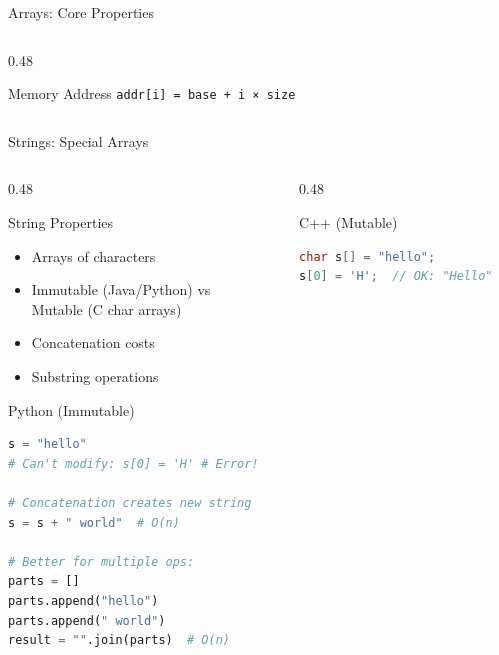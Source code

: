 \documentclass[aspectratio=169,xcolor=dvipsnames]{beamer}
\begin{document}
\begin{frame}{Arrays: Core Properties}
\begin{columns}
\begin{column}{0.48\textwidth}

      \vspace{0.3cm}

      \begin{alertblock}{Memory Address}
        \texttt{addr[i] = base + i × size}
      \end{alertblock}
    \end{column}
  \end{columns}
\end{frame}

\begin{frame}[fragile]{Strings: Special Arrays}
  \begin{columns}
    \begin{column}{0.48\textwidth}
      \begin{block}{String Properties}
        \begin{itemize}
          \item Arrays of characters
          \item Immutable (Java/Python) vs \\
                Mutable (C char arrays)
          \item Concatenation costs
          \item Substring operations
        \end{itemize}
      \end{block}

      \vspace{0.2cm}

      \begin{exampleblock}{Python (Immutable)}
        \begin{lstlisting}[language=Python,basicstyle=\tiny\ttfamily]
s = "hello"
# Can't modify: s[0] = 'H' # Error!

# Concatenation creates new string
s = s + " world"  # O(n)

# Better for multiple ops:
parts = []
parts.append("hello")
parts.append(" world")
result = "".join(parts)  # O(n)
        \end{lstlisting}
      \end{exampleblock}
    \end{column}
    \begin{column}{0.48\textwidth}
      \begin{exampleblock}{C++ (Mutable)}
        \begin{lstlisting}[language=C++,basicstyle=\tiny\ttfamily]
char s[] = "hello";
s[0] = 'H';  // OK: "Hello"


\end{lstlisting}
\end{exampleblock}
\end{column}
\end{columns}
\end{frame}
\end{document}
